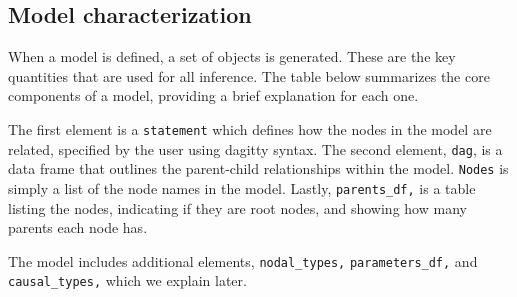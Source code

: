 \documentclass[
  article]{jss}
\begin{document}
\hypertarget{model-characterization}{%
\subsection{Model characterization}\label{model-characterization}}

When a model is defined, a set of objects is generated. These are the
key quantities that are used for all inference. The table below
summarizes the core components of a model, providing a brief explanation
for each one.

The first element is a \texttt{statement} which defines how the nodes in
the model are related, specified by the user using dagitty syntax. The
second element, \texttt{dag}, is a data frame that outlines the
parent-child relationships within the model. \texttt{Nodes} is simply a
list of the node names in the model. Lastly, \texttt{parents\_df,} is a
table listing the nodes, indicating if they are root nodes, and showing
how many parents each node has.

The model includes additional elements, \texttt{nodal\_types,}
\texttt{parameters\_df,} and \texttt{causal\_types,} which we explain
later.
\end{document}
